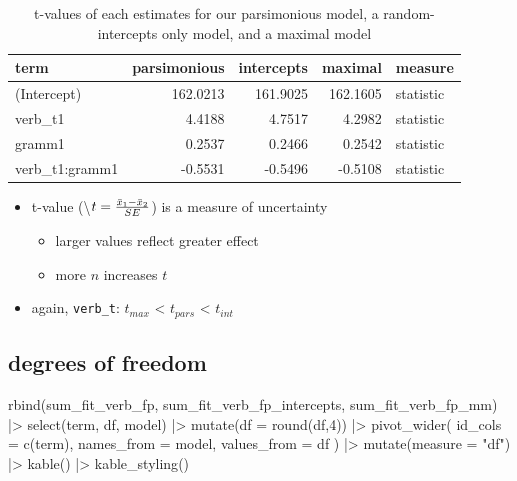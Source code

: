 \documentclass[
  letterpaper,
  DIV=11,
  numbers=noendperiod]{scrartcl}
\newenvironment{Shaded}{\begin{snugshade}}{\end{snugshade}}
\newcommand{\AttributeTok}[1]{\textcolor[rgb]{0.40,0.45,0.13}{#1}}
\newcommand{\DecValTok}[1]{\textcolor[rgb]{0.68,0.00,0.00}{#1}}
\newcommand{\FunctionTok}[1]{\textcolor[rgb]{0.28,0.35,0.67}{#1}}
\newcommand{\NormalTok}[1]{\textcolor[rgb]{0.00,0.23,0.31}{#1}}
\newcommand{\SpecialCharTok}[1]{\textcolor[rgb]{0.37,0.37,0.37}{#1}}
\newcommand{\StringTok}[1]{\textcolor[rgb]{0.13,0.47,0.30}{#1}}
\providecommand{\tightlist}{%
  \setlength{\itemsep}{0pt}\setlength{\parskip}{0pt}}\usepackage{longtable,booktabs,array}
\begin{document}
\hypertarget{tbl-t_value}{}
\begin{longtable}[t]{lrrrl}
\caption{\label{tbl-t_value}t-values of each estimates for our parsimonious model, a
random-intercepts only model, and a maximal model }\tabularnewline

\toprule
term & parsimonious & intercepts & maximal & measure\\
\midrule
(Intercept) & 162.0213 & 161.9025 & 162.1605 & statistic\\
verb\_t1 & 4.4188 & 4.7517 & 4.2982 & statistic\\
gramm1 & 0.2537 & 0.2466 & 0.2542 & statistic\\
verb\_t1:gramm1 & -0.5531 & -0.5496 & -0.5108 & statistic\\
\bottomrule
\end{longtable}

\begin{itemize}
\tightlist
\item
  t-value (\textbackslash{}\(t = \frac{\bar{x}_1 - \bar{x}_2}{SE}\\\))
  is a measure of uncertainty

  \begin{itemize}
  \tightlist
  \item
    larger values reflect greater effect
  \item
    more \(n\) increases \(t\)
  \end{itemize}
\item
  again, \texttt{verb\_t}: \(t_{max}\) \textless{} \(t_{pars}\)
  \textless{} \(t_{int}\)
\end{itemize}

\hypertarget{degrees-of-freedom}{%
\subsection{degrees of freedom}\label{degrees-of-freedom}}

\begin{Shaded}
\begin{Highlighting}[]
\FunctionTok{rbind}\NormalTok{(sum\_fit\_verb\_fp, sum\_fit\_verb\_fp\_intercepts, sum\_fit\_verb\_fp\_mm) }\SpecialCharTok{|\textgreater{}} 
  \FunctionTok{select}\NormalTok{(term, df, model) }\SpecialCharTok{|\textgreater{}}
  \FunctionTok{mutate}\NormalTok{(}\AttributeTok{df =} \FunctionTok{round}\NormalTok{(df,}\DecValTok{4}\NormalTok{)) }\SpecialCharTok{|\textgreater{}} 
  \FunctionTok{pivot\_wider}\NormalTok{(}
    \AttributeTok{id\_cols =} \FunctionTok{c}\NormalTok{(term),}
    \AttributeTok{names\_from =}\NormalTok{ model,}
    \AttributeTok{values\_from =}\NormalTok{ df}
\NormalTok{  ) }\SpecialCharTok{|\textgreater{}} 
  \FunctionTok{mutate}\NormalTok{(}\AttributeTok{measure =} \StringTok{"df"}\NormalTok{) }\SpecialCharTok{|\textgreater{}} 
  \FunctionTok{kable}\NormalTok{() }\SpecialCharTok{|\textgreater{}} 
  \FunctionTok{kable\_styling}\NormalTok{()}
\end{Highlighting}
\end{Shaded}
\end{document}
